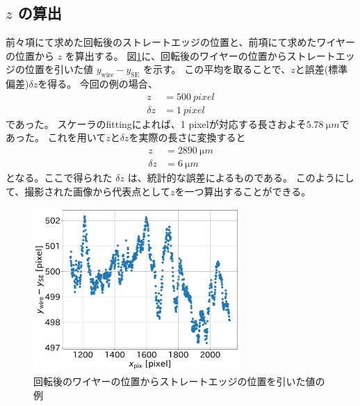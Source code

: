 \documentclass[../../main.tex]{subfiles}
\begin{document}
\subsection{$z$ の算出}
前々項にて求めた回転後のストレートエッジの位置と、前項にて求めたワイヤーの位置から $z$ を算出する。
図\ref{fig:wiresag_wire_se_positions_diff}に、回転後のワイヤーの位置からストレートエッジの位置を引いた値 $y_{\mathrm{wire}}-y_{\mathrm{SE}}$ を示す。
この平均を取ることで、$z$と誤差(標準偏差)$\delta z$を得る。
今回の例の場合、
\begin{align}
    z &= \SI{500}{pixel} \\
    \delta z &= \SI{1}{pixel}
\end{align}
であった。
スケーラのfittingによれば、1 pixelが対応する長さおよそ$\SI{5.78}{\micro m}$であった。
これを用いて$z$と$\delta z$を実際の長さに変換すると
\begin{align}
    z &= \SI{2890}{\micro m} \\
    \delta z &= \SI{6}{\micro m}
\end{align}
となる。ここで得られた $\delta z$ は、統計的な誤差によるものである。
このようにして、撮影された画像から代表点として$z$を一つ算出することができる。
\begin{figure}[H]
    \centering
    \includegraphics[width=0.7\textwidth]{wiresag/wiresag_wire_se_positions_diff.pdf}
    \caption{回転後のワイヤーの位置からストレートエッジの位置を引いた値の例}
    \label{fig:wiresag_wire_se_positions_diff}    
\end{figure}
\end{document}
